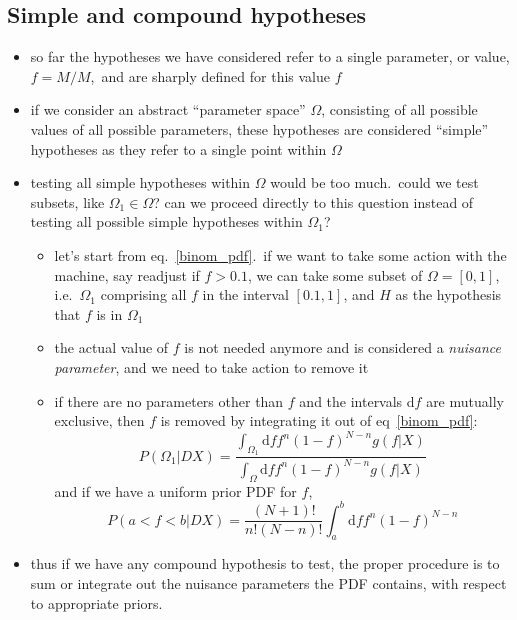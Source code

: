 \documentclass[../jaynes_prob_theory_notes.tex]{subfiles}
\begin{document}
\subsection{Simple and compound hypotheses}
    \begin{itemize}
        \item so far the hypotheses we have considered refer to a single parameter, or value, $f = M/M$,\ and are sharply defined for this value $f$
        \item if we consider an abstract ``parameter space'' $\Omega$, consisting of all possible values of all possible parameters, these hypotheses are considered ``simple'' hypotheses as they refer to a single point within $\Omega$
        \item testing all simple hypotheses within $\Omega$ would be too much.\ could we test subsets, like ${\Omega}_1 \in \Omega$? can we proceed directly to this question instead of testing all possible simple hypotheses within ${\Omega}_1$?
            \begin{itemize}
                \item let's start from eq.~\ref{binom_pdf}.\ if we want to take some action with the machine, say readjust if $f > 0.1$, we can take some subset of $\Omega = [0,1]$, i.e.\ ${\Omega}_1$ comprising all $f$ in the interval $[0.1,1]$, and $H$ as the hypothesis that $f$ is in ${\Omega}_1$
                \item the actual value of $f$ is not needed anymore and is considered a \textit{nuisance parameter}, and we need to take action to remove it
                \item if there are no parameters other than $f$ and the intervals d$f$ are mutually exclusive, then $f$ is removed by integrating it out of eq~\ref{binom_pdf}:
                    \begin{equation*}
                        P(\Omega_1|DX) = \frac{\int_{\Omega_1}\mathrm{d}f f^n{(1-f)}^{N-n}g(f|X)}{\int_{\Omega}\mathrm{d}f f^n{(1-f)}^{N-n}g(f|X)} 
                    \end{equation*}
                and if we have a uniform prior PDF for $f$,
                    \begin{equation*}
                        P(a < f < b|DX) = \frac{(N+1)!}{n!(N-n)!}\int^b_{a}\mathrm{d}f f^n{(1-f)}^{N-n}
                    \end{equation*}
            \end{itemize}
        \item thus if we have any compound hypothesis to test, the proper procedure is to sum or integrate out the nuisance parameters the PDF contains, with respect to appropriate priors.
    \end{itemize}
\end{document}
